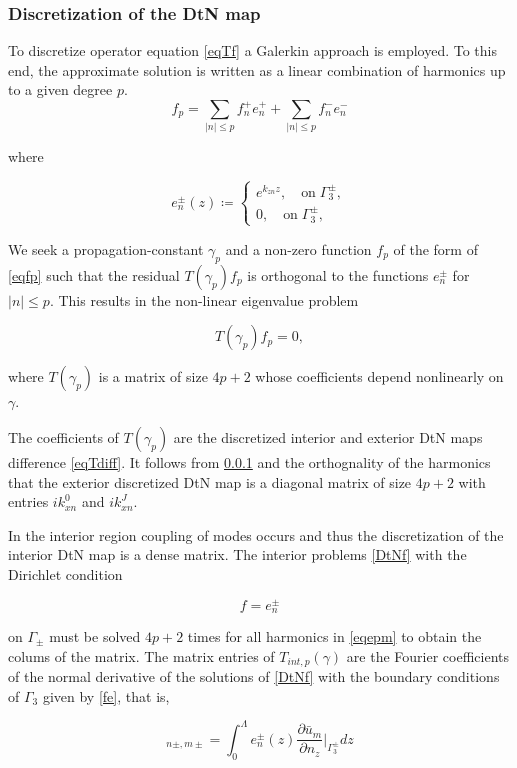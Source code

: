 \subsubsection{Discretization of the DtN map}
To discretize operator equation \ref{eqTf} a Galerkin approach is
employed. To this end, the approximate solution is written as a linear
combination of harmonics up to a given degree $p$.
\begin{equation}
f_p = \sum_{|n|\leq p} f_n^+ e_n^+ + \sum_{|n| \leq p} f_n^- e_n^-
\label{eqfp}
\end{equation} 

where

\begin{equation}
e_n^\pm (z)\coloneqq \left \{ \begin{array} {ll}
e^{k_{zn} z}, \quad \textrm{on} \; \Gamma_3^{\pm}, \\
0, \quad \textrm{on} \; \Gamma_3^\pm,
\end{array} \right .
\label{eqepm}
\end{equation} 

We seek a propagation-constant $\gamma_p$ and a non-zero function $f_p$ of
the form of \ref{eqfp} such that the residual $T(\gamma_p) f_p$ is
orthogonal to the functions $e_n^\pm$ for $|n| \leq p$. This
results in the non-linear eigenvalue problem

\begin{equation}
T(\gamma_p) f_p = 0,
\end{equation} 

where $T(\gamma_p)$ is a matrix of size $4p+2$ whose coefficients depend nonlinearly on $\gamma$.

The coefficients of $T(\gamma_p)$ are the discretized interior and
exterior DtN maps difference \ref{eqTdiff}. It follows from \ref{} and
the orthognality of the harmonics that the exterior discretized DtN
map is a diagonal matrix of size $4p+2$ with entries $ik_{xn}^0$ and
$ik_{xn}^J$.

In the interior region coupling of modes occurs and thus the
discretization of the interior DtN map is a dense matrix. The interior
problems \ref{DtNf} with the Dirichlet condition

\begin{equation}
  f = e_n^\pm
\label{fe}
\end{equation} 

on $\Gamma_\pm$ must be solved $4p+2$ times for all harmonics in
\ref{eqepm} to obtain the colums of the matrix. The matrix entries of
$T_{int,p}(\gamma)$ are the Fourier coefficients of the normal
derivative of the solutions of \ref{DtNf} with the boundary conditions of
$\Gamma_3$ given by \ref{fe}, that is,

\begin{equation} [T_{int,p}(\gamma)]_{n \pm,m \pm} = \int_0^\Lambda
e_n^\pm(z) \frac{\partial \bar{u}_m}{\partial n_z} \bigg|_{\Gamma_3^\pm} dz
\end{equation}


